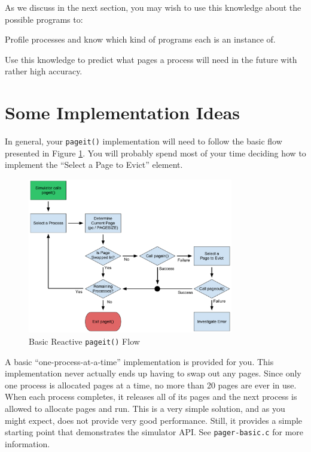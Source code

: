 \documentclass[12pt]{article}
\newenvironment{packed_enum}{
\begin{enumerate}
  \setlength{\itemsep}{1pt}
  \setlength{\parskip}{0pt}
  \setlength{\parsep}{0pt}
}{\end{enumerate}}
\begin{document}
As we discuss in the next section,
you may wish to use this knowledge about the possible programs to:
\begin{packed_enum}
\item Profile processes and know which kind of programs each is an
  instance of.
\item Use this knowledge to predict what pages a process will need
  in the future with rather high accuracy.
\end{packed_enum}

\section{Some Implementation Ideas}

In general, your \texttt{pageit()} implementation will need to follow
the basic flow presented in Figure \ref{fig:pageit-reactive}. You will
probably spend most of your time deciding how to implement the ``Select
a Page to Evict'' element.

\begin{figure}[htbp]
  \begin{center}
    \includegraphics[width=0.8\textwidth]{pageit-Fig1.pdf}
    \caption{Basic Reactive \texttt{pageit()} Flow}
    \label{fig:pageit-reactive}
  \end{center}
\end{figure}

A basic ``one-process-at-a-time'' implementation is provided for
you. This implementation never actually ends up having to swap out any
pages. Since only one process is allocated pages at a time, no more than
20 pages are ever in use. When each process completes, it releases all
of its pages and the next process is allowed to allocate pages and
run. This is a very simple solution, and as you might expect, does not
provide very good performance. Still, it provides a simple starting
point that demonstrates the simulator API. See \texttt{pager-basic.c} for more
information.
\end{document}

